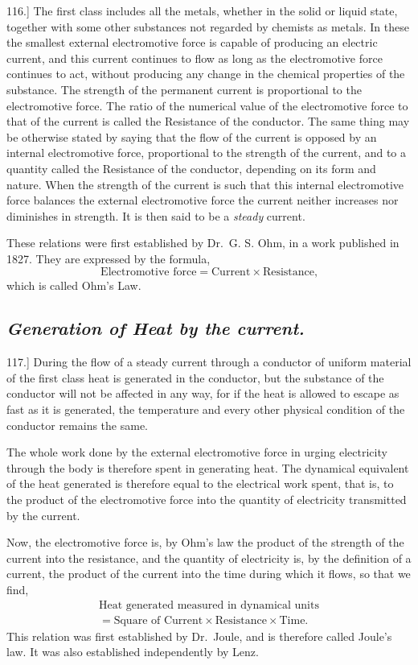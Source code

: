 \documentclass[12pt,oneside]{book}[2021/10/04]
\newcommand{\Heading}{\centering\normalfont}
\newcommand{\Subsection}[1]{\subsection*{\normalsize\Heading\itshape #1}}
\newcommand{\Runhead}[1]{\fancyhead[C]{\iffloatpage{}{\small#1}}}
\newcommand{\article}[1]{\phantomsection \label{art:#1}{#1.]}}
\newcommand{\¬}{\hphantom{0}}
\begin{document}
\article{116} The first class includes all the metals, whether in the solid
or liquid state, together with some other substances not regarded
by chemists as metals. In these the smallest external electromotive
force is capable of producing an electric current, and this current
continues to flow as long as the electromotive force continues to
act, without producing any change in the chemical properties of the
substance. The strength of the permanent current is proportional
to the electromotive force. The ratio of the numerical value of the
electromotive force to that of the current is called the Resistance
of the conductor. The same thing may be otherwise stated by
saying that the flow of the current is opposed by an internal
electromotive force, proportional to the strength of the current,
and to a quantity called the Resistance of the conductor, depending
on its form and nature. When the strength of the current is such
that this internal electromotive force balances the external electromotive
force the current neither increases nor diminishes in strength.
It is then said to be a \textit{steady} current.

These relations were first established by Dr.\ G. S. Ohm, in a
work published in 1827. They are expressed by the formula,
\[
\text{Electromotive force} = \text{Current} \times \text{Resistance,}
\]
which is called Ohm's Law.
\Runhead{OHM'S LAW.}

\Subsection{Generation of Heat by the current.}

\article{117} During the flow of a steady current through a conductor
of uniform material of the first class heat is generated in the
conductor, but the substance of the conductor will not be affected
in any way, for if the heat is allowed to escape as fast as it is
generated, the temperature and every other physical condition of
the conductor remains the same.

The whole work done by the external electromotive force in
urging electricity through the body is therefore spent in generating
heat. The dynamical equivalent of the heat generated is therefore
equal to the electrical work spent, that is, to the product of the
electromotive force into the quantity of electricity transmitted by
the current.

Now, the electromotive force is, by Ohm's law the product of
the strength of the current into the resistance, and the quantity
of electricity is, by the definition of a current, the product of the
current into the time during which it flows, so that we find,
\begin{multline*}
\text{Heat generated measured in dynamical units}\\
= \text{Square of Current} \times \text{Resistance} \times \text{Time.}
\end{multline*}
This relation was first established by Dr.\ Joule, and is therefore
called Joule's law. It was also established independently by Lenz.
\Runhead{JOULE'S LAW.}
\end{document}
